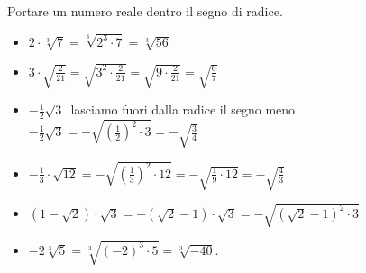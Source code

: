 \begin{exrig}
 \begin{esempio}
 Portare un numero reale dentro il segno di radice.
 \begin{itemize}
 \item $2\cdot \sqrt[3]7=\sqrt[3]{2^3\cdot 7}=\sqrt[3]{56}$
 \item $3\cdot \sqrt{\frac 2{21}}=\sqrt{3^2\cdot \frac 2{21}}=
        \sqrt{9\cdot \frac 2{21}}=\sqrt{\frac 6 7}$
 \item $-\frac 1 2\sqrt 3$\, lasciamo fuori dalla radice il segno meno 
       $-\frac 1 2\sqrt 3=-\sqrt{\left(\frac 1 2\right)^2\cdot 3}=
        -\sqrt{\frac 3 4}$
 \item $-\frac 1 3\cdot \sqrt{12}=-\sqrt{\left(\frac 1 3\right)^2\cdot 12}=
        -\sqrt{\frac 1 9\cdot 12}=-\sqrt{\frac 4 3}$
 \item $(1-\sqrt 2)\cdot \sqrt 3=-(\sqrt 2-1)\cdot \sqrt 3=
        -\sqrt{(\sqrt 2-1)^2\cdot 3}$
 \item $-2\sqrt[3]5=\sqrt[3]{(-2)^3\cdot 5}=\sqrt[3]{-40}$.
 \end{itemize}
 \end{esempio}


\end{exrig}
